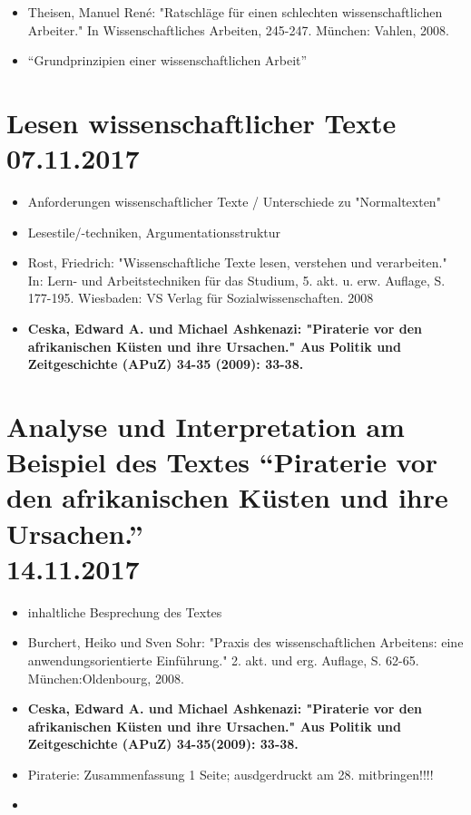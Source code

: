 \documentclass[emulatestandardclasses]{scrartcl}
\begin{document}
\begin{itemize}
  \item Theisen, Manuel René: "Ratschläge für einen schlechten wissenschaftlichen Arbeiter." In Wissenschaftliches Arbeiten, 245-247. München: Vahlen, 2008.
  \item "`Grundprinzipien einer wissenschaftlichen Arbeit"'
\end{itemize}



\section{Lesen wissenschaftlicher Texte\\07.11.2017}

\begin{itemize}
  \item Anforderungen wissenschaftlicher Texte / Unterschiede zu "Normaltexten"
  \item Lesestile/-techniken, Argumentationsstruktur
  \item Rost, Friedrich: "Wissenschaftliche Texte lesen, verstehen und verarbeiten." In: Lern- und Arbeitstechniken für das Studium, 5. akt. u. erw. Auflage, S. 177-195. Wiesbaden: VS Verlag für Sozialwissenschaften. 2008
  \item \textbf{Ceska, Edward A. und Michael Ashkenazi: "Piraterie vor den afrikanischen Küsten und ihre Ursachen." Aus Politik und Zeitgeschichte (APuZ) 34-35 (2009): 33-38.}
\end{itemize}


\section{Analyse und Interpretation am Beispiel des Textes "`Piraterie vor den afrikanischen Küsten und ihre Ursachen."'\\14.11.2017}

\begin{itemize}
  \item inhaltliche Besprechung des Textes
  \item Burchert, Heiko und Sven Sohr: "Praxis des wissenschaftlichen Arbeitens: eine anwendungsorientierte Einführung." 2. akt. und erg. Auflage, S. 62-65. München:Oldenbourg, 2008.
  \item \textbf{Ceska, Edward A. und Michael Ashkenazi: "Piraterie vor den afrikanischen Küsten und ihre Ursachen." Aus Politik und Zeitgeschichte (APuZ) 34-35(2009): 33-38.}
\end{itemize}

\begin{itemize}
  \item Piraterie: Zusammenfassung 1 Seite; ausdgerdruckt am 28. mitbringen!!!!
  \item 
\end{itemize}


\newpage
\end{document}
